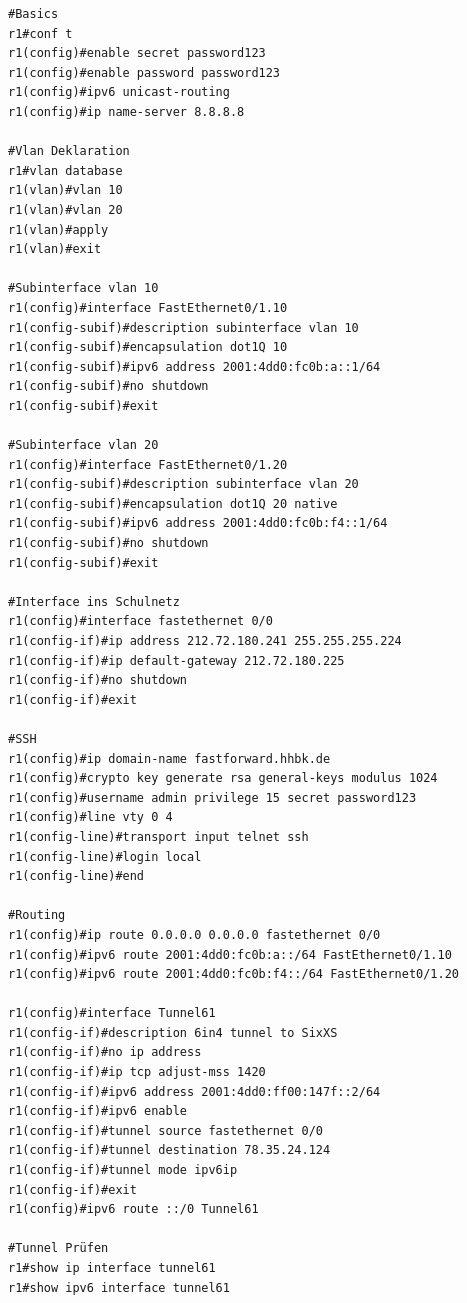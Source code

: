 \begin{lstlisting}[numbers=none]
#Basics
r1#conf t
r1(config)#enable secret password123
r1(config)#enable password password123
r1(config)#ipv6 unicast-routing
r1(config)#ip name-server 8.8.8.8

#Vlan Deklaration
r1#vlan database 
r1(vlan)#vlan 10
r1(vlan)#vlan 20
r1(vlan)#apply
r1(vlan)#exit

#Subinterface vlan 10
r1(config)#interface FastEthernet0/1.10
r1(config-subif)#description subinterface vlan 10
r1(config-subif)#encapsulation dot1Q 10
r1(config-subif)#ipv6 address 2001:4dd0:fc0b:a::1/64
r1(config-subif)#no shutdown
r1(config-subif)#exit

#Subinterface vlan 20
r1(config)#interface FastEthernet0/1.20
r1(config-subif)#description subinterface vlan 20
r1(config-subif)#encapsulation dot1Q 20 native
r1(config-subif)#ipv6 address 2001:4dd0:fc0b:f4::1/64
r1(config-subif)#no shutdown
r1(config-subif)#exit

#Interface ins Schulnetz
r1(config)#interface fastethernet 0/0
r1(config-if)#ip address 212.72.180.241 255.255.255.224
r1(config-if)#ip default-gateway 212.72.180.225
r1(config-if)#no shutdown
r1(config-if)#exit

#SSH
r1(config)#ip domain-name fastforward.hhbk.de
r1(config)#crypto key generate rsa general-keys modulus 1024
r1(config)#username admin privilege 15 secret password123
r1(config)#line vty 0 4
r1(config-line)#transport input telnet ssh
r1(config-line)#login local
r1(config-line)#end

#Routing
r1(config)#ip route 0.0.0.0 0.0.0.0 fastethernet 0/0
r1(config)#ipv6 route 2001:4dd0:fc0b:a::/64 FastEthernet0/1.10
r1(config)#ipv6 route 2001:4dd0:fc0b:f4::/64 FastEthernet0/1.20

r1(config)#interface Tunnel61
r1(config-if)#description 6in4 tunnel to SixXS
r1(config-if)#no ip address
r1(config-if)#ip tcp adjust-mss 1420
r1(config-if)#ipv6 address 2001:4dd0:ff00:147f::2/64
r1(config-if)#ipv6 enable
r1(config-if)#tunnel source fastethernet 0/0
r1(config-if)#tunnel destination 78.35.24.124
r1(config-if)#tunnel mode ipv6ip
r1(config-if)#exit
r1(config)#ipv6 route ::/0 Tunnel61

#Tunnel Prüfen
r1#show ip interface tunnel61
r1#show ipv6 interface tunnel61
\end{lstlisting}


